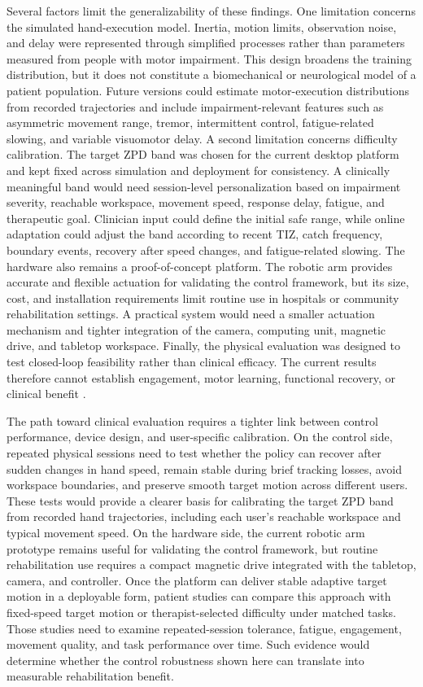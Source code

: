\documentclass[journal,twoside,web]{ieeecolor2}
\begin{document}
Several factors limit the generalizability of these findings. One limitation concerns the simulated hand-execution model. Inertia, motion limits, observation noise, and delay were represented through simplified processes rather than parameters measured from people with motor impairment. This design broadens the training distribution, but it does not constitute a biomechanical or neurological model of a patient population. Future versions could estimate motor-execution distributions from recorded trajectories and include impairment-relevant features such as asymmetric movement range, tremor, intermittent control, fatigue-related slowing, and variable visuomotor delay. A second limitation concerns difficulty calibration. The target ZPD band was chosen for the current desktop platform and kept fixed across simulation and deployment for consistency. A clinically meaningful band would need session-level personalization based on impairment severity, reachable workspace, movement speed, response delay, fatigue, and therapeutic goal. Clinician input could define the initial safe range, while online adaptation could adjust the band according to recent TIZ, catch frequency, boundary events, recovery after speed changes, and fatigue-related slowing. The hardware also remains a proof-of-concept platform. The robotic arm provides accurate and flexible actuation for validating the control framework, but its size, cost, and installation requirements limit routine use in hospitals or community rehabilitation settings. A practical system would need a smaller actuation mechanism and tighter integration of the camera, computing unit, magnetic drive, and tabletop workspace. Finally, the physical evaluation was designed to test closed-loop feasibility rather than clinical efficacy. The current results therefore cannot establish engagement, motor learning, functional recovery, or clinical benefit \cite{stinearStrokeRehab2020,gomesTaskChallenge2025,boardsworthUpperLimbRobotic2025,keneaImmersiveVR2025,altawilAdaptiveVR2026}.

The path toward clinical evaluation requires a tighter link between control performance, device design, and user-specific calibration. On the control side, repeated physical sessions need to test whether the policy can recover after sudden changes in hand speed, remain stable during brief tracking losses, avoid workspace boundaries, and preserve smooth target motion across different users. These tests would provide a clearer basis for calibrating the target ZPD band from recorded hand trajectories, including each user's reachable workspace and typical movement speed. On the hardware side, the current robotic arm prototype remains useful for validating the control framework, but routine rehabilitation use requires a compact magnetic drive integrated with the tabletop, camera, and controller. Once the platform can deliver stable adaptive target motion in a deployable form, patient studies can compare this approach with fixed-speed target motion or therapist-selected difficulty under matched tasks. Those studies need to examine repeated-session tolerance, fatigue, engagement, movement quality, and task performance over time. Such evidence would determine whether the control robustness shown here can translate into measurable rehabilitation benefit.
\end{document}
